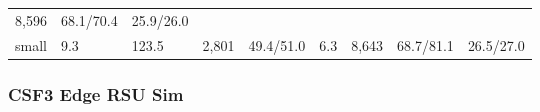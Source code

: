 \documentclass[
  9pt, a4paper, landscape]{article}
\begin{document}
\begin{longtable}[]{@{}lllllllll@{}}
\begin{minipage}[t]{0.08\columnwidth}
8,596\strut
\end{minipage} & \begin{minipage}[t]{0.08\columnwidth}\raggedright
68.1/70.4\strut
\end{minipage} & \begin{minipage}[t]{0.08\columnwidth}\raggedright
25.9/26.0\strut
\end{minipage}\tabularnewline
\begin{minipage}[t]{0.08\columnwidth}\raggedright
small\strut
\end{minipage} & \begin{minipage}[t]{0.08\columnwidth}\raggedright
9.3\strut
\end{minipage} & \begin{minipage}[t]{0.08\columnwidth}\raggedright
123.5\strut
\end{minipage} & \begin{minipage}[t]{0.08\columnwidth}\raggedright
2,801\strut
\end{minipage} & \begin{minipage}[t]{0.08\columnwidth}\raggedright
49.4/51.0\strut
\end{minipage} & \begin{minipage}[t]{0.08\columnwidth}\raggedright
6.3\strut
\end{minipage} & \begin{minipage}[t]{0.08\columnwidth}\raggedright
8,643\strut
\end{minipage} & \begin{minipage}[t]{0.08\columnwidth}\raggedright
68.7/81.1\strut
\end{minipage} & \begin{minipage}[t]{0.08\columnwidth}\raggedright
26.5/27.0\strut
\end{minipage}\tabularnewline
\bottomrule
\end{longtable}

\hypertarget{csf3-edge-rsu-sim}{%
\subsubsection{CSF3 Edge RSU Sim}\label{csf3-edge-rsu-sim}}
\end{document}
